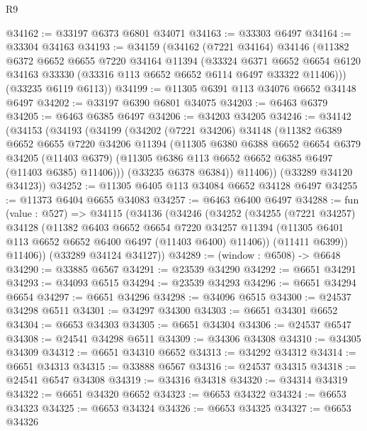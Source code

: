 \begin{lexlean}{R9}
\begin{coremodule}
@34162 := @33197 @6373 @6801 @34071
@34163 := @33303 @6497
@34164 := @33304 @34163
@34193 := @34159
    (@34162
      (@7221 @34164)
      @34146
      (@11382
        @6372
        @6652
        @6655
        @7220
        @34164
        @11394
        (@33324
          @6371
          @6652
          @6654
          @6120
          @34163
          @33330
          (@33316 @113 @6652 @6652 @6114 @6497 @33322 @11406)))
      (@33235 @6119 @6113))
@34199 := @11305 @6391 @113 @34076 @6652 @34148 @6497
@34202 := @33197 @6390 @6801 @34075
@34203 := @6463 @6379
@34205 := @6463 @6385 @6497
@34206 := @34203 @34205
@34246 := @34142
    (@34153
      (@34193
        (@34199
          (@34202
            (@7221 @34206)
            @34148
            (@11382
              @6389
              @6652
              @6655
              @7220
              @34206
              @11394
              (@11305
                @6380
                @6388
                @6652
                @6654
                @6379
                @34205
                (@11403 @6379)
                (@11305 @6386 @113 @6652 @6652 @6385 @6497 (@11403 @6385) @11406)))
            (@33235 @6378 @6384))
          @11406))
      (@33289 @34120 @34123))
@34252 := @11305 @6405 @113 @34084 @6652 @34128 @6497
@34255 := @11373 @6404 @6655 @34083
@34257 := @6463 @6400 @6497
@34288 := fun (value : @527) =>
  @34115
    (@34136
      (@34246
        (@34252
          (@34255
            (@7221 @34257)
            @34128
            (@11382
              @6403
              @6652
              @6654
              @7220
              @34257
              @11394
              (@11305 @6401 @113 @6652 @6652 @6400 @6497 (@11403 @6400) @11406))
            (@11411 @6399))
          @11406))
      (@33289 @34124 @34127))
@34289 := (window : @6508) -> @6648
@34290 := @33885 @6567
@34291 := @23539 @34290
@34292 := @6651 @34291
@34293 := @34093 @6515
@34294 := @23539 @34293
@34296 := @6651 @34294 @6654
@34297 := @6651 @34296
@34298 := @34096 @6515
@34300 := @24537 @34298 @6511
@34301 := @34297 @34300
@34303 := @6651 @34301 @6652
@34304 := @6653 @34303
@34305 := @6651 @34304
@34306 := @24537 @6547
@34308 := @24541 @34298 @6511
@34309 := @34306 @34308
@34310 := @34305 @34309
@34312 := @6651 @34310 @6652
@34313 := @34292 @34312
@34314 := @6651 @34313
@34315 := @33888 @6567
@34316 := @24537 @34315
@34318 := @24541 @6547 @34308
@34319 := @34316 @34318
@34320 := @34314 @34319
@34322 := @6651 @34320 @6652
@34323 := @6653 @34322
@34324 := @6653 @34323
@34325 := @6653 @34324
@34326 := @6653 @34325
@34327 := @6653 @34326

\end{coremodule}
\end{lexlean}
